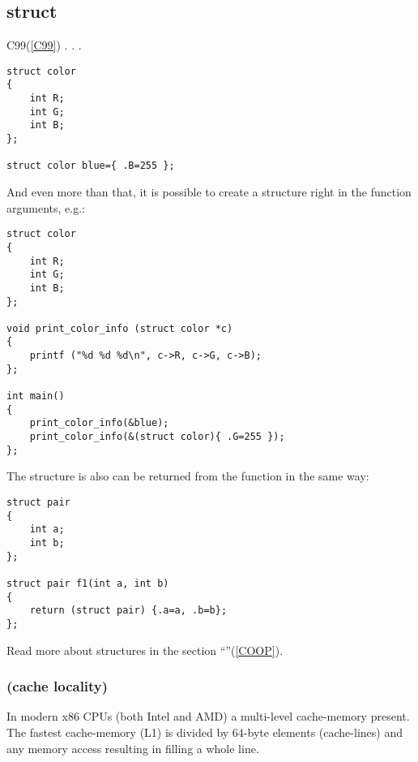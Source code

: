﻿\subsection{struct}

 C99(\ref{C99}) .
.
.

\begin{lstlisting}
struct color
{
	int R;
	int G;
	int B;
};

struct color blue={ .B=255 };
\end{lstlisting}

{And even more than that, it is possible to create a structure right in the function arguments, e.g.}:

\begin{lstlisting}
struct color
{
	int R;
	int G;
	int B;
};

void print_color_info (struct color *c)
{
	printf ("%d %d %d\n", c->R, c->G, c->B);
};

int main()
{
	print_color_info(&blue);
	print_color_info(&(struct color){ .G=255 });
};
\end{lstlisting}

{The structure is also can be returned from the function in the same way}:

\begin{lstlisting}
struct pair
{
	int a;
	int b;
};

struct pair f1(int a, int b)
{
	return (struct pair) {.a=a, .b=b};
};
\end{lstlisting}

{Read more about structures in the section} ``\COOPname''(\ref{COOP}).

\subsubsection{ (cache locality)}

{In modern x86 CPUs (both Intel and AMD) a multi-level cache-memory present}.
{The fastest cache-memory (L1) is divided by 64-byte elements (cache-lines) and any
memory access resulting in filling a whole line}\cite{AgnerFog}.

